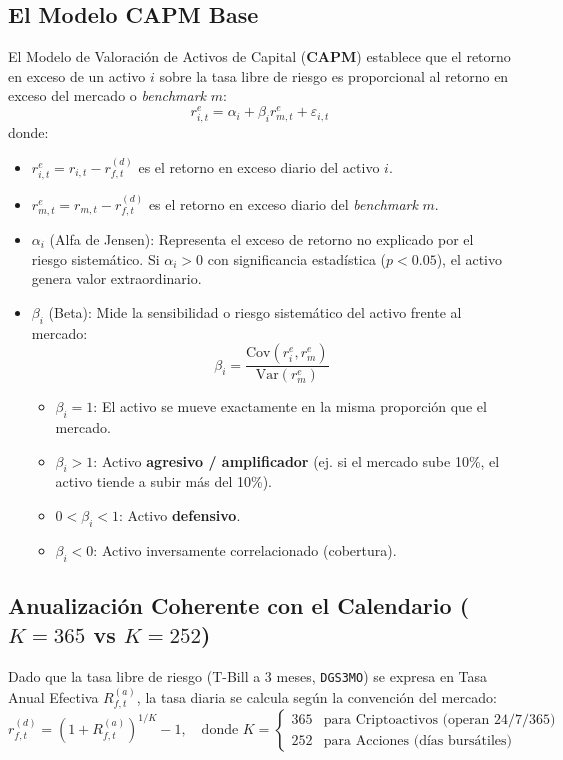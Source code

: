 \documentclass[11pt,a4paper]{article}
\begin{document}
\subsection{El Modelo CAPM Base}
El Modelo de Valoración de Activos de Capital (\textbf{CAPM}) establece que el retorno en exceso de un activo $i$ sobre la tasa libre de riesgo es proporcional al retorno en exceso del mercado o \textit{benchmark} $m$:
\begin{equation}
r_{i,t}^e = \alpha_i + \beta_i r_{m,t}^e + \varepsilon_{i,t}
\end{equation}
donde:
\begin{itemize}
    \item $r_{i,t}^e = r_{i,t} - r_{f,t}^{(d)}$ es el retorno en exceso diario del activo $i$.
    \item $r_{m,t}^e = r_{m,t} - r_{f,t}^{(d)}$ es el retorno en exceso diario del \textit{benchmark} $m$.
    \item $\alpha_i$ (Alfa de Jensen): Representa el exceso de retorno no explicado por el riesgo sistemático. Si $\alpha_i > 0$ con significancia estadística ($p < 0.05$), el activo genera valor extraordinario.
    \item $\beta_i$ (Beta): Mide la sensibilidad o riesgo sistemático del activo frente al mercado:
    \begin{equation}
    \beta_i = \frac{\text{Cov}(r_i^e, r_m^e)}{\text{Var}(r_m^e)}
    \end{equation}
    \begin{itemize}
        \item $\beta_i = 1$: El activo se mueve exactamente en la misma proporción que el mercado.
        \item $\beta_i > 1$: Activo \textbf{agresivo / amplificador} (ej. si el mercado sube 10\%, el activo tiende a subir más del 10\%).
        \item $0 < \beta_i < 1$: Activo \textbf{defensivo}.
        \item $\beta_i < 0$: Activo inversamente correlacionado (cobertura).
    \end{itemize}
\end{itemize}

\subsection{Anualización Coherente con el Calendario ($K=365$ vs $K=252$)}
Dado que la tasa libre de riesgo (T-Bill a 3 meses, \texttt{DGS3MO}) se expresa en Tasa Anual Efectiva $R_{f,t}^{(a)}$, la tasa diaria se calcula según la convención del mercado:
\begin{equation}
r_{f,t}^{(d)} = (1 + R_{f,t}^{(a)})^{1/K} - 1, \quad \text{donde } K = 
\begin{cases} 
365 & \text{para Criptoactivos (operan 24/7/365)} \\
252 & \text{para Acciones (días bursátiles)}
\end{cases}
\end{equation}
\end{document}
